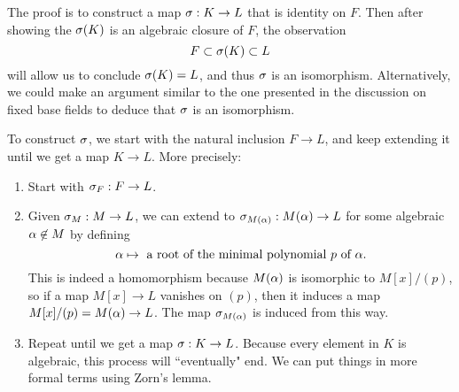 The proof is to construct a map $\sigma: K \rightarrow L$ that is identity on $F$. Then after showing the $\sigma(K)$ is an algebraic closure of $F$, the observation
\[
    F \subset \sigma(K) \subset L
\]
will allow us to conclude $\sigma(K) = L$, and thus $\sigma$ is an isomorphism. Alternatively, we could make an argument similar to the one presented in the discussion on fixed base fields to deduce that $\sigma$ is an isomorphism.

To construct $\sigma$, we start with the natural inclusion $F \rightarrow L$, and keep extending it until we get a map $K \rightarrow L$. More precisely:
\begin{enumerate}
    \item Start with $\sigma_F : F \rightarrow L$.
    \item Given $\sigma_M: M \rightarrow L$, we can extend to $\sigma_{M(\alpha)}: M(\alpha) \rightarrow L$ for some algebraic $\alpha \not \in M$ by defining
        \[
            \alpha \mapsto \text{ a root of the minimal polynomial $p$ of $\alpha$.}
        \]
        This is indeed a homomorphism because $M(\alpha)$ is isomorphic to $M[x]/(p)$, so if a map $M[x] \rightarrow L$ vanishes on $(p)$, then it induces a map $M[x]/(p) = M(\alpha) \rightarrow L$. The map $\sigma_{M(\alpha)}$ is induced from this way.
    \item Repeat until we get a map $\sigma: K \rightarrow L$. Because every element in $K$ is algebraic, this process will ``eventually" end. We can put things in more formal terms using Zorn's lemma.
\end{enumerate}
